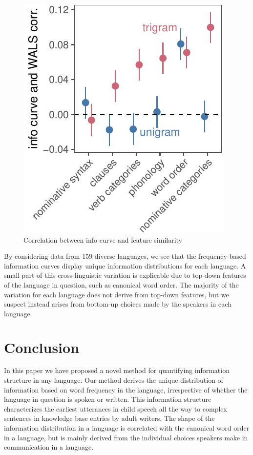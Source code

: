 \documentclass[10pt, letterpaper]{article}
\newenvironment{CodeChunk}{}{}
\begin{document}
\begin{CodeChunk}
\begin{figure}[tb]
\includegraphics{figs/type_cors-1} \caption[Correlation between info curve and feature similarity]{Correlation between info curve and feature similarity}\label{fig:type_cors}
\end{figure}
\end{CodeChunk}

By considering data from \(159\) diverse languages, we see that the
frequency-based information curves display unique information
distributions for each language. A small part of this cross-linguistic
variation is explicable due to top-down features of the language in
question, such as canonical word order. The majority of the variation
for each language does not derive from top-down features, but we suspect
instead arises from bottom-up choices made by the speakers in each
language.

\hypertarget{conclusion}{%
\section{Conclusion}\label{conclusion}}

In this paper we have proposed a novel method for quantifying
information structure in any language. Our method derives the unique
distribution of information based on word frequency in the language,
irrespective of whether the language in question is spoken or written.
This information structure characterizes the earliest utterances in
child speech all the way to complex sentences in knowledge base entries
by adult writers. The shape of the information distribution in a
language is correlated with the canonical word order in a language, but
is mainly derived from the individual choices speakers make in
communication in a language.
\end{document}

